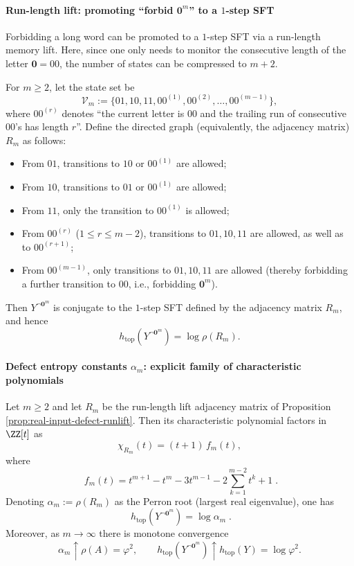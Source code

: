 \paragraph{Run-length lift: promoting ``forbid \texorpdfstring{$\mathbf{0}^m$}{0m}'' to a \texorpdfstring{$1$}{1}-step SFT}
Forbidding a long word can be promoted to a $1$-step SFT via a run-length memory lift. Here, since one only needs to monitor the consecutive length of the letter $\mathbf{0}=00$, the number of states can be compressed to $m+2$.

\begin{proposition}\label{prop:real-input-defect-runlift}
For $m\ge 2$, let the state set be
\[
\mathcal{V}_m:=\{01,10,11,00^{(1)},00^{(2)},\dots,00^{(m-1)}\},
\]
where $00^{(r)}$ denotes ``the current letter is $00$ and the trailing run of consecutive $00$'s has length $r$''.
Define the directed graph (equivalently, the adjacency matrix) $R_m$ as follows:
\begin{itemize}
  \item From $01$, transitions to $10$ or $00^{(1)}$ are allowed;
  \item From $10$, transitions to $01$ or $00^{(1)}$ are allowed;
  \item From $11$, only the transition to $00^{(1)}$ is allowed;
  \item From $00^{(r)}$ ($1\le r\le m-2$), transitions to $01,10,11$ are allowed, as well as to $00^{(r+1)}$;
  \item From $00^{(m-1)}$, only transitions to $01,10,11$ are allowed (thereby forbidding a further transition to $00$, i.e., forbidding $\mathbf{0}^m$).
\end{itemize}
Then $Y^{\neg \mathbf{0}^m}$ is conjugate to the $1$-step SFT defined by the adjacency matrix $R_m$, and hence
\[
h_{\mathrm{top}}\!\left(Y^{\neg \mathbf{0}^m}\right)=\log\rho(R_m).
\]
\end{proposition}

\paragraph{Defect entropy constants \texorpdfstring{$\alpha_m$}{alpha m}: explicit family of characteristic polynomials}
\begin{theorem}\label{thm:real-input-defect-entropy}
Let $m\ge 2$ and let $R_m$ be the run-length lift adjacency matrix of Proposition \ref{prop:real-input-defect-runlift}.
Then its characteristic polynomial factors in $\ZZ[t]$ as
\[
\chi_{R_m}(t)=(t+1)\,f_m(t),
\]
where
\[
\boxed{\;
f_m(t)=t^{m+1}-t^{m}-3t^{m-1}-2\sum_{k=1}^{m-2}t^k+1\; }.
\]
Denoting $\alpha_m:=\rho(R_m)$ as the Perron root (largest real eigenvalue), one has
\[
\boxed{\;
h_{\mathrm{top}}\!\left(Y^{\neg \mathbf{0}^m}\right)=\log\alpha_m\; }.
\]
Moreover, as $m\to\infty$ there is monotone convergence
\[
\alpha_m\uparrow \rho(A)=\varphi^2,
\qquad
h_{\mathrm{top}}\!\left(Y^{\neg \mathbf{0}^m}\right)\uparrow h_{\mathrm{top}}(Y)=\log\varphi^2.
\]
\end{theorem}

